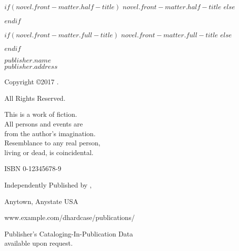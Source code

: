 \documentclass[v2,$lang$]{novel} %
\begin{document}
\frontmatter

\thispagestyle{empty}
$if(novel.front-matter.half-title)$
$novel.front-matter.half-title$
$else$
\vspace*{6\nbs}
\hfill\charscale[2.4]{\textbf{\theTitle}}\par
$endif$
\clearpage

\thispagestyle{empty}
\null
\clearpage

\thispagestyle{empty}
\vspace*{5\nbs}
\begin{center}
$if(novel.front-matter.full-title)$
$novel.front-matter.full-title$
$else$
\charscale[3.6]{\textbf{\theTitle}}\par
$endif$
\vspace{1.5\nbs}
\charscale[1.6]{\theSubtitle}\par
\vspace{4\nbs}
\vspace{4\nbs}
{\theAuthor}
\vfill
{ $publisher.name$\\
$publisher.address$}\par

\end{center}
\clearpage


\thispagestyle{empty}
\begin{center}
\itshape{
\null
\vfill
\textsc{\theTitle}\par
Copyright ©2017 \theAuthor.\par %
All Rights Reserved.\par %
\null
This is a work of fiction.\\
All persons and events are\\
from the author's imagination.\\
Resemblance to any real person,\\
living or dead, is coincidental.\par %
\null
ISBN 0-12345678-9\par %
\null

Independently Published by \theAuthor,\par %
Anytown, Anystate USA\par %
www.example.com/dhardcase/publications/\par %
\null
Publisher's Cataloging-In-Publication Data\\
available upon request.\par
} %
\end{center}
\clearpage
\end{document}
